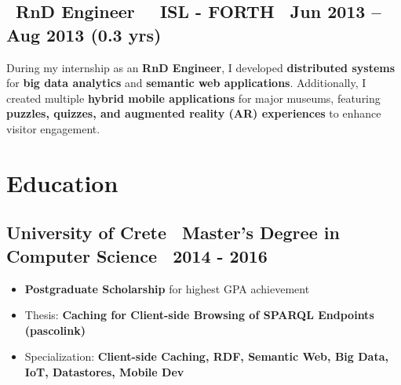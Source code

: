 \documentclass[a4paper,10pt]{article}
\begin{document}
\vspace{1pt}


\subsection*{\faBriefcase\ \textbf{RnD Engineer} \textbar\ \faBuilding\ ISL - FORTH \hfill \faCalendar\ Jun 2013 – Aug 2013 (0.3 yrs)}
\vspace{1pt}
\begin{adjustwidth}{1em}{1em}
During my internship as an \textbf{RnD Engineer}, I developed \textbf{distributed systems} for \textbf{big data analytics} and \textbf{semantic web applications}. Additionally, I created multiple \textbf{hybrid mobile applications} for major museums, featuring \textbf{puzzles, quizzes, and augmented reality (AR) experiences} to enhance visitor engagement.
\end{adjustwidth}

\vspace{1pt}

\section*{ Education}

\subsection*{ University of Crete \textbar\ Master's Degree in Computer Science \textbar\ 2014 - 2016}

\begin{adjustwidth}{1em}{1em}
    \begin{itemize}[left=0pt]
        \item \textbf{Postgraduate Scholarship} for highest GPA achievement
        \item Thesis: \textbf{Caching for Client-side Browsing of SPARQL Endpoints (pascolink)}
        \item Specialization: \textbf{Client-side Caching, RDF, Semantic Web, Big Data, IoT, Datastores, Mobile Dev}
    \end{itemize}
\end{adjustwidth}
\end{document}
